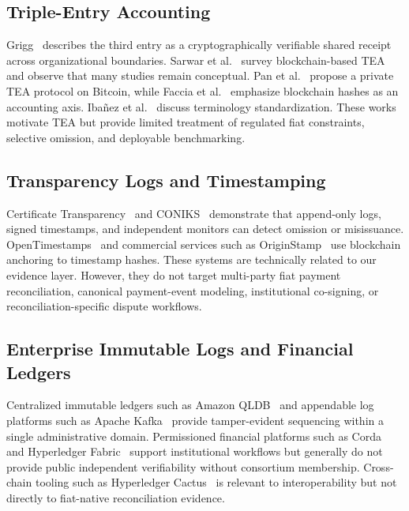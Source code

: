 \documentclass[journal]{IEEEtran}
\begin{document}
\subsection{Triple-Entry Accounting}
Grigg~\cite{grigg2024tea} describes the third entry as a cryptographically verifiable shared receipt across organizational boundaries. Sarwar et al.~\cite{sarwar2023blockchains, sarwar2026survey} survey blockchain-based TEA and observe that many studies remain conceptual. Pan et al.~\cite{pan2023private} propose a private TEA protocol on Bitcoin, while Faccia et al.~\cite{faccia2020blockchain} emphasize blockchain hashes as an accounting axis. Iba\~{n}ez et al.~\cite{ibanez2025tea} discuss terminology standardization. These works motivate TEA but provide limited treatment of regulated fiat constraints, selective omission, and deployable benchmarking.

\subsection{Transparency Logs and Timestamping}
Certificate Transparency~\cite{laurie2013rfc6962} and CONIKS~\cite{melara2015coniks} demonstrate that append-only logs, signed timestamps, and independent monitors can detect omission or misissuance. OpenTimestamps~\cite{toddtimestamps} and commercial services such as OriginStamp~\cite{originstamp} use blockchain anchoring to timestamp hashes. These systems are technically related to our evidence layer. However, they do not target multi-party fiat payment reconciliation, canonical payment-event modeling, institutional co-signing, or reconciliation-specific dispute workflows.

\subsection{Enterprise Immutable Logs and Financial Ledgers}
Centralized immutable ledgers such as Amazon QLDB~\cite{amazonqldb} and appendable log platforms such as Apache Kafka~\cite{apachekafka} provide tamper-evident sequencing within a single administrative domain. Permissioned financial platforms such as Corda~\cite{brown2016corda} and Hyperledger Fabric~\cite{androulaki2018fabric} support institutional workflows but generally do not provide public independent verifiability without consortium membership. Cross-chain tooling such as Hyperledger Cactus~\cite{hyperledgercactus} is relevant to interoperability but not directly to fiat-native reconciliation evidence.
\end{document}
